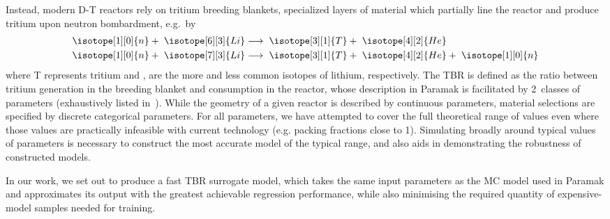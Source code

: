 Instead, modern D-T reactors rely on tritium breeding blankets, specialized
layers of material which partially line the reactor and produce tritium upon
neutron bombardment, e.g.~by 
\begin{eqnarray}
	\isotope[1][0]{n} + \hspace{3pt} \isotope[6][3]{Li} 
	&\longrightarrow \hspace{3pt} 
	\isotope[3][1]{T} + \hspace{3pt}\isotope[4][2]{He} \\
	\isotope[1][0]{n} + \hspace{3pt} \isotope[7][3]{Li} 
	&\longrightarrow \hspace{3pt} 
	\isotope[3][1]{T} + \hspace{3pt} \isotope[4][2]{He} + \hspace{3pt} \isotope[1][0]{n}
\end{eqnarray}%
where T represents tritium and ,  are the more and
less common isotopes of lithium, respectively. The TBR is defined as the ratio
between tritium generation in the breeding blanket and consumption in the
reactor, whose description in Paramak is facilitated by 2~classes of parameters
(exhaustively listed in~). While the geometry of a given
reactor is described by continuous parameters, material selections are specified
by discrete categorical parameters. For all parameters, we have attempted to cover the full theoretical range of values even where those values are practically infeasible with current technology (e.g. packing fractions close to 1). Simulating broadly around typical values of parameters is necessary to construct the most accurate model of the typical range, and also aids in demonstrating the robustness of constructed models.

In our work, we set out to produce a fast TBR surrogate model, which takes the same input parameters as the MC model used in Paramak and approximates its output with the greatest achievable regression performance, while also minimising the required quantity of expensive-model samples needed for training.

